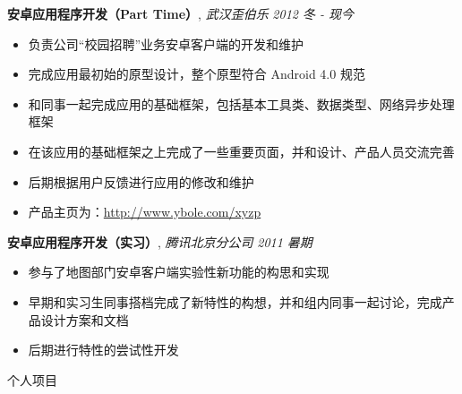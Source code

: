 \documentclass[9pt]{ctexart}
\newenvironment{changemargin}[2]{%
    \begin{list}{}{%
            \setlength{\topsep}{0pt}%
            \setlength{\leftmargin}{#1}%
            \setlength{\rightmargin}{#2}%
            \setlength{\listparindent}{\parindent}%
        \setlength{\itemindent}{\parindent}%
            \setlength{\parsep}{\parskip}%
        }%
  \item[]}{\end{list}
      }
\newcommand{\lineover}{
          \begin{changemargin}{-0.05in}{-0.05in}
              \vspace*{-8pt}
              \hrulefill \\
              \vspace*{-2pt}
          \end{changemargin}
      }
\newcommand{\header}[1]{
          \begin{changemargin}{-0.5in}{-0.5in}
              \scshape{#1}\\
              \lineover
          \end{changemargin}
      }
\newenvironment{body} {
          \vspace*{-16pt}
          \begin{changemargin}{-0.25in}{-0.5in}
          }	
      {\end{changemargin}
      }
\begin{document}
      \begin{body}
          \vspace{14pt}
          \textbf{安卓应用程序开发（Part Time）}, \emph{武汉歪伯乐} \hfill \emph{2012 冬 - 现今}\\
          \vspace*{-4pt}
      \begin{itemize} \itemsep -0pt  %
              \item 负责公司“校园招聘”业务安卓客户端的开发和维护
              \item 完成应用最初始的原型设计，整个原型符合 Android 4.0 规范
              \item 和同事一起完成应用的基础框架，包括基本工具类、数据类型、网络异步处理框架
              \item 在该应用的基础框架之上完成了一些重要页面，并和设计、产品人员交流完善
              \item 后期根据用户反馈进行应用的修改和维护
              \item 产品主页为：\url{http://www.ybole.com/xyzp}
          \end{itemize}

          \textbf {安卓应用程序开发（实习）}, \emph{腾讯北京分公司} \hfill \emph{2011 暑期}\\
          \vspace*{-4pt}
      \begin{itemize} \itemsep -0pt
              \item 参与了地图部门安卓客户端实验性新功能的构思和实现
              \item 早期和实习生同事搭档完成了新特性的构想，并和组内同事一起讨论，完成产品设计方案和文档
              \item 后期进行特性的尝试性开发
          \end{itemize}
      \end{body}

      \smallskip


      \header{个人项目}
\end{document}
